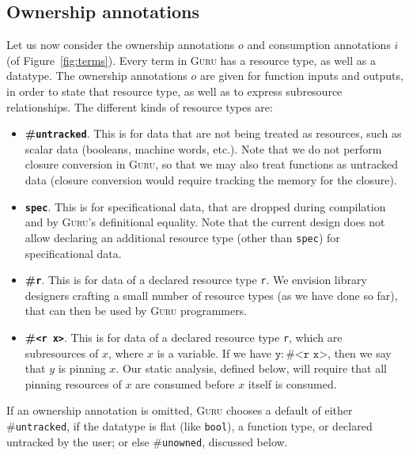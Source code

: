 \documentclass[9pt,natbib]{sigplanconf}
\begin{document}
\subsection{Ownership annotations}

Let us now consider the ownership annotations $o$ and consumption
annotations $i$ (of Figure~\ref{fig:terms}).  Every term in
\textsc{Guru} has a resource type, as well as a datatype.  The
ownership annotations $o$ are given for function inputs and outputs,
in order to state that resource type, as well as to express
subresource relationships.  The different kinds of resource types
are:
\begin{itemize}
\item \textbf{\#\texttt{untracked}}.  This is for data that are not
  being treated as resources, such as scalar data (booleans, machine
  words, etc.).  Note that we do not perform closure conversion in
  \textsc{Guru}, so that we may also treat functions as untracked data
  (closure conversion would require tracking the memory for the
  closure).

\item \textbf{\texttt{spec}}. This is for specificational data, that
  are dropped during compilation and by \textsc{Guru}'s definitional
  equality.  Note that the current design does not allow declaring an
  additional resource type (other than \texttt{spec}) for
  specificational data.

\item \textbf{\#\texttt{r}}. This is for data of a declared resource
  type \texttt{r}.  We envision library designers crafting a small
  number of resource types (as we have done so far), that can then be
  used by \textsc{Guru} programmers.
 
\item \textbf{\#\texttt{<r\ x>}}. This is for data of a declared
  resource type \texttt{r}, which are subresources of $x$, where $x$
  is a variable.  If we have $\texttt{y} : \#\texttt{<r\ x>}$, then we say that
  $y$ is pinning $x$.  Our static analysis, defined below, will
  require that all pinning resources of $x$ are consumed before $x$
  itself is consumed.

\end{itemize}

\noindent If an ownership annotation is omitted, \textsc{Guru} chooses
a default of either \#\texttt{untracked}, if the datatype is flat
(like \texttt{bool}), a function type, or declared untracked by the
user; or else \#\texttt{unowned}, discussed below.
\end{document}
